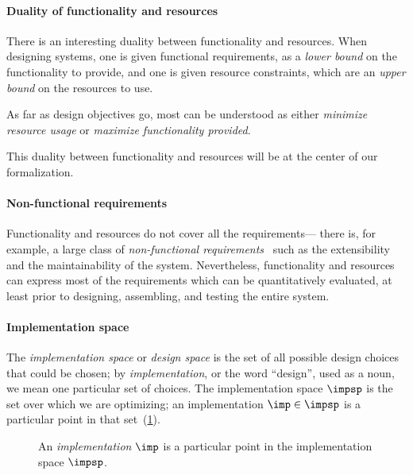 \paragraph{Duality of functionality and resources}

There is an interesting duality between functionality and resources. When designing systems, one is given functional requirements, as a \emph{lower bound} on the functionality to provide, and one is given resource constraints, which are an \emph{upper bound} on the resources to use.

As far as design objectives go, most can be understood as either \emph{minimize resource usage}
or \emph{maximize functionality provided}.

This duality between functionality and resources will be at the
center of our formalization.

\paragraph{Non-functional requirements}

Functionality and resources do not cover all the requirements--- there is, for example, a
large class of \emph{non-functional requirements}~\cite{deweck2011} such as the extensibility and the
maintainability of the system. Nevertheless, functionality and resources can express most of
the requirements which can be quantitatively evaluated, at least prior to designing, assembling,
and testing the entire system.

\paragraph{Implementation space}

The \emph{implementation space} or \textit{design space} is the set of all possible design choices that could be chosen; by \textit{implementation}, or the word ``design'', used as a noun, we mean one particular  set of choices. The implementation space $\impsp$ is the set over which we are optimizing; an implementation $\imp\in\impsp$ is a particular point in that set~(\cref{fig:impspace}).

\begin{figure}[h!]
    \begin{center}
    \end{center}
    \caption{An \emph{implementation} $\imp$ is a particular point in the implementation space $\impsp$.}
    \label{fig:impspace}
\end{figure}


